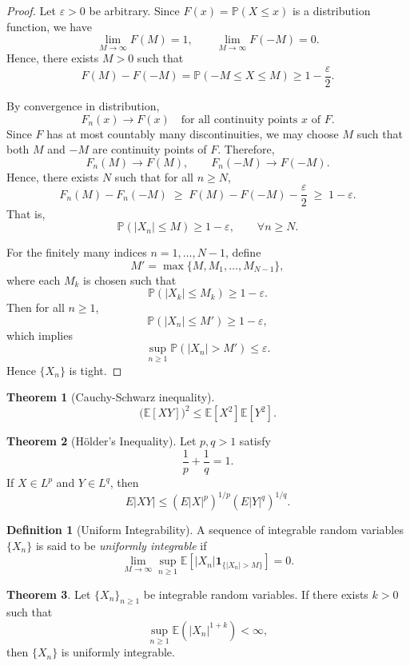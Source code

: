 \documentclass[11pt]{article}
\theoremstyle{definition}
\newtheorem{defn}{Definition}[section]
\newtheorem{theo}{Theorem}[section]
\begin{document}
\begin{proof}
Let $\varepsilon > 0$ be arbitrary.  
Since $F(x) = \mathbb{P}(X \le x)$ is a distribution function, we have
\[
\lim_{M \to \infty} F(M) = 1,
\qquad
\lim_{M \to \infty} F(-M) = 0.
\]
Hence, there exists $M > 0$ such that
\[
F(M) - F(-M) = \mathbb{P}(-M \le X \le M) \ge 1 - \frac{\varepsilon}{2}.
\]

By convergence in distribution,
\[
F_n(x) \longrightarrow F(x)
\quad \text{for all continuity points } x \text{ of } F.
\]
Since $F$ has at most countably many discontinuities, we may choose $M$ such that
both $M$ and $-M$ are continuity points of $F$.  
Therefore,
\[
F_n(M) \longrightarrow F(M),
\qquad
F_n(-M) \longrightarrow F(-M).
\]
Hence, there exists $N$ such that for all $n \ge N$,
\[
F_n(M) - F_n(-M)
\;\ge\;
F(M) - F(-M) - \frac{\varepsilon}{2}
\;\ge\;
1 - \varepsilon.
\]
That is,
\[
\mathbb{P}(|X_n| \le M) \ge 1 - \varepsilon,
\qquad \forall n \ge N.
\]

For the finitely many indices $n=1,\dots,N-1$, define
\[
M' = \max\{M, M_1, \dots, M_{N-1}\},
\]
where each $M_k$ is chosen such that
\[
\mathbb{P}(|X_k| \le M_k) \ge 1 - \varepsilon.
\]
Then for all $n \ge 1$,
\[
\mathbb{P}(|X_n| \le M') \ge 1 - \varepsilon,
\]
which implies
\[
\sup_{n \ge 1} \mathbb{P}(|X_n| > M') \le \varepsilon.
\]
Hence $\{X_n\}$ is tight.
\end{proof}
\begin{theo}[Cauchy-Schwarz inequality]
    \[
\bigl(\mathbb{E}[XY]\bigr)^2 \le \mathbb{E}[X^2]\mathbb{E}[Y^2].
\]
\end{theo}
\begin{theo}[Hölder's Inequality]
Let $p,q>1$ satisfy
\[
\frac{1}{p}+\frac{1}{q}=1.
\]
If $X\in L^p$ and $Y\in L^q$, then
\[
E|XY|
\leq
\left(E|X|^p\right)^{1/p}
\left(E|Y|^q\right)^{1/q}.
\]
\end{theo}
\begin{defn}[Uniform Integrability]
A sequence of integrable random variables $\{X_n\}$ is said to be
\emph{uniformly integrable} if
\[
\lim_{M\to\infty}
\sup_{n\ge1}
\mathbb{E}\!\left[
|X_n|\mathbf{1}_{\{|X_n|>M\}}
\right]
=0.
\]
\end{defn}

\begin{theo}
Let $\{X_n\}_{n\ge 1}$ be integrable random variables.  
If there exists $k>0$ such that
\[
\sup_{n\ge 1} \mathbb{E}\!\left(|X_n|^{1+k}\right) < \infty,
\]
then $\{X_n\}$ is uniformly integrable.
\end{theo}
\end{document}
